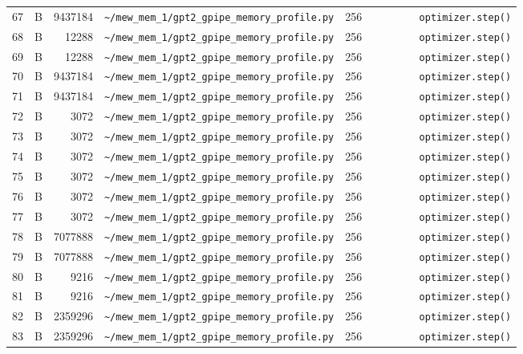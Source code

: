 \documentclass{article}
\begin{document}
\begin{longtable}{r l r p{6.5cm} r p{7.0cm}}
67 & B & 9437184 & \lstinline|~/mew_mem_1/gpt2_gpipe_memory_profile.py| & 256 & \lstinline|        optimizer.step()| \\
68 & B & 12288 & \lstinline|~/mew_mem_1/gpt2_gpipe_memory_profile.py| & 256 & \lstinline|        optimizer.step()| \\
69 & B & 12288 & \lstinline|~/mew_mem_1/gpt2_gpipe_memory_profile.py| & 256 & \lstinline|        optimizer.step()| \\
70 & B & 9437184 & \lstinline|~/mew_mem_1/gpt2_gpipe_memory_profile.py| & 256 & \lstinline|        optimizer.step()| \\
71 & B & 9437184 & \lstinline|~/mew_mem_1/gpt2_gpipe_memory_profile.py| & 256 & \lstinline|        optimizer.step()| \\
72 & B & 3072 & \lstinline|~/mew_mem_1/gpt2_gpipe_memory_profile.py| & 256 & \lstinline|        optimizer.step()| \\
73 & B & 3072 & \lstinline|~/mew_mem_1/gpt2_gpipe_memory_profile.py| & 256 & \lstinline|        optimizer.step()| \\
74 & B & 3072 & \lstinline|~/mew_mem_1/gpt2_gpipe_memory_profile.py| & 256 & \lstinline|        optimizer.step()| \\
75 & B & 3072 & \lstinline|~/mew_mem_1/gpt2_gpipe_memory_profile.py| & 256 & \lstinline|        optimizer.step()| \\
76 & B & 3072 & \lstinline|~/mew_mem_1/gpt2_gpipe_memory_profile.py| & 256 & \lstinline|        optimizer.step()| \\
77 & B & 3072 & \lstinline|~/mew_mem_1/gpt2_gpipe_memory_profile.py| & 256 & \lstinline|        optimizer.step()| \\
78 & B & 7077888 & \lstinline|~/mew_mem_1/gpt2_gpipe_memory_profile.py| & 256 & \lstinline|        optimizer.step()| \\
79 & B & 7077888 & \lstinline|~/mew_mem_1/gpt2_gpipe_memory_profile.py| & 256 & \lstinline|        optimizer.step()| \\
80 & B & 9216 & \lstinline|~/mew_mem_1/gpt2_gpipe_memory_profile.py| & 256 & \lstinline|        optimizer.step()| \\
81 & B & 9216 & \lstinline|~/mew_mem_1/gpt2_gpipe_memory_profile.py| & 256 & \lstinline|        optimizer.step()| \\
82 & B & 2359296 & \lstinline|~/mew_mem_1/gpt2_gpipe_memory_profile.py| & 256 & \lstinline|        optimizer.step()| \\
83 & B & 2359296 & \lstinline|~/mew_mem_1/gpt2_gpipe_memory_profile.py| & 256 & \lstinline|        optimizer.step()| \\

\end{longtable}
\end{document}
